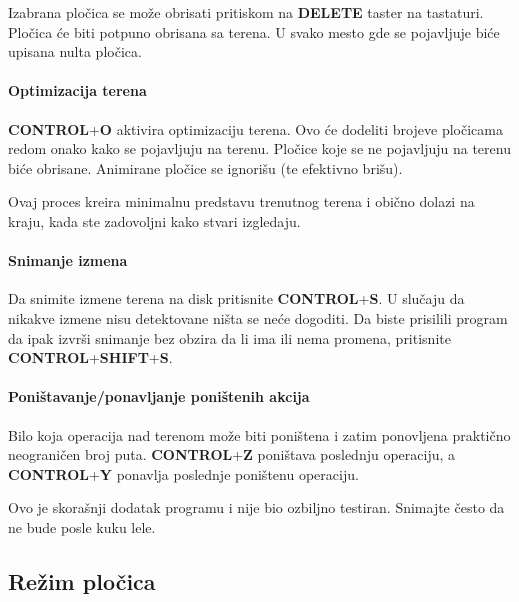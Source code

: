\documentclass[a4paper,12pt]{article}
\begin{document}
Izabrana plo\v cica se mo\v ze obrisati pritiskom na {\bf DELETE} taster na tastaturi. Plo\v cica \'ce biti
potpuno obrisana sa terena. U svako mesto gde se pojavljuje bi\'ce upisana nulta plo\v cica.

\paragraph{Optimizacija terena}\mbox{}
\vspace{\baselineskip}

{\bf CONTROL}+{\bf O} aktivira optimizaciju terena. Ovo \'ce dodeliti brojeve plo\v cicama redom onako kako se
pojavljuju na terenu. Plo\v cice koje se ne pojavljuju na terenu bi\'ce obrisane. Animirane plo\v cice se
ignori\v su (te efektivno bri\v su).

Ovaj proces kreira minimalnu predstavu trenutnog terena i obi\v cno dolazi na kraju, kada ste zadovoljni kako
stvari izgledaju.

\paragraph{Snimanje izmena}\mbox{}
\vspace{\baselineskip}

Da snimite izmene terena na disk pritisnite {\bf CONTROL}+{\bf S}. U slu\v caju da nikakve izmene nisu
detektovane ni\v sta se ne\'ce dogoditi. Da biste prisilili program da ipak izvr\v si snimanje bez obzira da li
ima ili nema promena, pritisnite {\bf CONTROL}+{\bf SHIFT}+{\bf S}.

\pagebreak
\paragraph{Poni\v stavanje/ponavljanje poni\v stenih akcija}\mbox{}
\vspace{\baselineskip}

Bilo koja operacija nad terenom mo\v ze biti poni\v stena i zatim ponovljena prakti\v cno neograni\v cen broj
puta. {\bf CONTROL}+{\bf Z} poni\v stava poslednju operaciju, a {\bf CONTROL}+{\bf Y} ponavlja poslednje
poni\v stenu operaciju.

Ovo je skora\v snji dodatak programu i nije bio ozbiljno testiran. Snimajte \v cesto da ne bude posle kuku lele.

\newpage
\subsection{Re\v zim plo\v cica} \label{tileMode}
\end{document}
